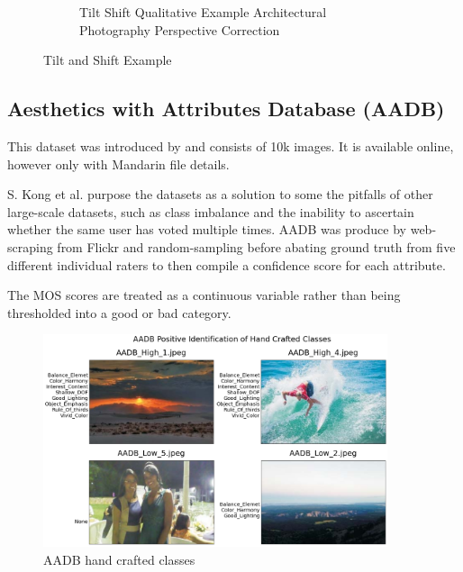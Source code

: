 \begin{figure}[ht!]
\begin{subfigure}[b]{0.5\textwidth}
\label{tile quality eg 2}
\caption{Tilt Shift Qualitative Example Architectural Photography Perspective Correction}
\end{subfigure}
    \caption{Tilt and Shift Example \cite{Cannon2019}}
    \label{fig:tilt shift all egs}
\specialrule{0.01em}{1em}{1em}
\end{figure}


\newpage

\subsection{Aesthetics with Attributes Database (AADB) }
\label{iaqa datsets appendix} 
This dataset was introduced by \cite{Kong2016}  and consists of 10k images. It is available online, however only with Mandarin file details. 

S. Kong et al. purpose the datasets as a solution to some the pitfalls of other large-scale datasets, such as class imbalance and the inability to ascertain whether the same user has voted multiple times. AADB was produce by web-scraping from Flickr and random-sampling before abating ground truth from five different individual raters to then compile a confidence score for each attribute. 

The MOS scores are treated as a continuous variable rather than being thresholded into a good or bad category. 
\pagebreak 

\begin{figure}
\centering
\includegraphics[width=0.9\textwidth]{figures/database_ims/AADB_2.png}
  \caption{\label{fig:AADB_1} AADB hand crafted classes}
  \label{fig:AADB1}
\end{figure}

